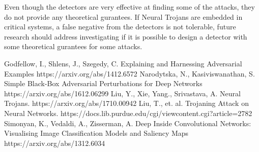 \documentclass[letterpaper, 10 pt, conference]{ieeeconf}  %
\begin{document}
Even though the detectors are very effective at finding some of the attacks,
they do not provide any theoretical gurantees. If Neural Trojans are embedded
in critical systems, a false negative from the detectors is not tolerable,
future research should address investigating if it is possible to design a
detector with some theoretical gurantees for some attacks.


\begin{thebibliography}{99}
 Godfellow, I., Shlens, J., Szegedy, C. Explaining and Harnessing Adversarial Examples https://arxiv.org/abs/1412.6572
 Narodytska, N., Kasiviswanathan, S. Simple Black-Box Adversarial Perturbations for Deep Networks https://arxiv.org/abs/1612.06299
 Liu, Y., Xie, Yang., Srivastava, A. Neural Trojans. https://arxiv.org/abs/1710.00942
 Liu, T., et. al. Trojaning Attack on Neural Networks. https://docs.lib.purdue.edu/cgi/viewcontent.cgi?article=2782 
 Simonyan, K., Vedaldi, A., Zisserman, A. Deep Inside Convolutional Networks: Visualising Image Classification Models and Saliency Maps https://arxiv.org/abs/1312.6034
\end{thebibliography}
\end{document}
